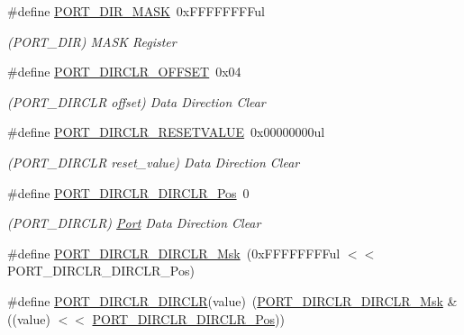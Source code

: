 \begin{DoxyCompactItemize}
\item 
\#define \mbox{\hyperlink{group___s_a_m_d21___p_o_r_t_ga1ac033c587515efaff3b5002747b1295}{P\+O\+R\+T\+\_\+\+D\+I\+R\+\_\+\+M\+A\+SK}}~0x\+F\+F\+F\+F\+F\+F\+F\+Ful
\begin{DoxyCompactList}\small\item\em (P\+O\+R\+T\+\_\+\+D\+IR) M\+A\+SK Register \end{DoxyCompactList}\item 
\#define \mbox{\hyperlink{group___s_a_m_d21___p_o_r_t_ga6617757b2b2a4873ca225341c0350b6b}{P\+O\+R\+T\+\_\+\+D\+I\+R\+C\+L\+R\+\_\+\+O\+F\+F\+S\+ET}}~0x04
\begin{DoxyCompactList}\small\item\em (P\+O\+R\+T\+\_\+\+D\+I\+R\+C\+LR offset) Data Direction Clear \end{DoxyCompactList}\item 
\#define \mbox{\hyperlink{group___s_a_m_d21___p_o_r_t_gae97e35763f237bbf69af7623183891a1}{P\+O\+R\+T\+\_\+\+D\+I\+R\+C\+L\+R\+\_\+\+R\+E\+S\+E\+T\+V\+A\+L\+UE}}~0x00000000ul
\begin{DoxyCompactList}\small\item\em (P\+O\+R\+T\+\_\+\+D\+I\+R\+C\+LR reset\+\_\+value) Data Direction Clear \end{DoxyCompactList}\item 
\#define \mbox{\hyperlink{group___s_a_m_d21___p_o_r_t_gaab58ac44a417949e78c7e743c2b6cb8e}{P\+O\+R\+T\+\_\+\+D\+I\+R\+C\+L\+R\+\_\+\+D\+I\+R\+C\+L\+R\+\_\+\+Pos}}~0
\begin{DoxyCompactList}\small\item\em (P\+O\+R\+T\+\_\+\+D\+I\+R\+C\+LR) \mbox{\hyperlink{struct_port}{Port}} Data Direction Clear \end{DoxyCompactList}\item 
\#define \mbox{\hyperlink{group___s_a_m_d21___p_o_r_t_ga5c1e3f46819a99640cb16a7e16298c97}{P\+O\+R\+T\+\_\+\+D\+I\+R\+C\+L\+R\+\_\+\+D\+I\+R\+C\+L\+R\+\_\+\+Msk}}~(0x\+F\+F\+F\+F\+F\+F\+F\+Ful $<$$<$ P\+O\+R\+T\+\_\+\+D\+I\+R\+C\+L\+R\+\_\+\+D\+I\+R\+C\+L\+R\+\_\+\+Pos)
\item 
\#define \mbox{\hyperlink{group___s_a_m_d21___p_o_r_t_ga0d5423999a4724201584a4388c8d23c1}{P\+O\+R\+T\+\_\+\+D\+I\+R\+C\+L\+R\+\_\+\+D\+I\+R\+C\+LR}}(value)~(\mbox{\hyperlink{group___s_a_m_d21___p_o_r_t_ga5c1e3f46819a99640cb16a7e16298c97}{P\+O\+R\+T\+\_\+\+D\+I\+R\+C\+L\+R\+\_\+\+D\+I\+R\+C\+L\+R\+\_\+\+Msk}} \& ((value) $<$$<$ \mbox{\hyperlink{group___s_a_m_d21___p_o_r_t_gaab58ac44a417949e78c7e743c2b6cb8e}{P\+O\+R\+T\+\_\+\+D\+I\+R\+C\+L\+R\+\_\+\+D\+I\+R\+C\+L\+R\+\_\+\+Pos}}))

\end{DoxyCompactItemize}

